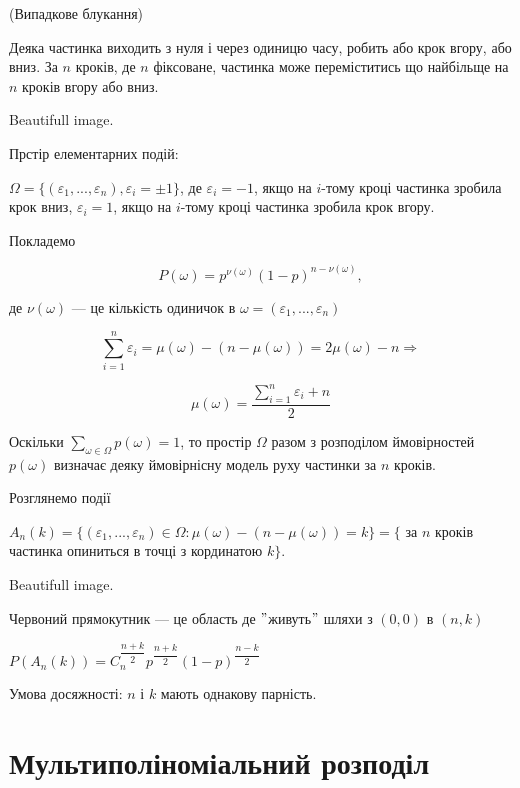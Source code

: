 \begin{example}(Випадкове блукання)

    Деяка частинка виходить з нуля і через одиницю часу, робить або крок вгору,
    або вниз. За $n$ кроків, де $n$ фіксоване, частинка може переміститись що
    найбільще на $n$ кроків вгору або вниз.
\end{example}

\begin{center}
    Beautifull image.
\end{center}

Прстір елементарних подій:

$\Omega = \{(\varepsilon_1, ..., \varepsilon_n), \varepsilon_i = \pm 1\}$, де
$\varepsilon_i = -1$, якщо на $i$-тому кроці частинка зробила крок вниз,
$\varepsilon_i = 1$, якщо на $i$-тому кроці частинка зробила крок вгору.

Покладемо

$$P(\omega) = p^{\nu(\omega)} (1-p)^{n - \nu(\omega)},$$

де $\nu(\omega)$ --- це кількість одиничок в $\omega = (\varepsilon_1, ..., \varepsilon_n)$

$$\sum\limits_{i=1}^n \varepsilon_i = \mu(\omega) - (n - \mu(\omega)) = 2\mu(\omega) - n \Rightarrow$$

$$\mu(\omega) = \dfrac{\sum\limits_{i=1}^n \varepsilon_i + n}{2}$$

Оскільки $\sum\limits_{\omega \in \Omega} p(\omega) = 1$, то простір $\Omega$ разом з
розподілом ймовірностей $p(\omega)$ визначає деяку ймовірнісну модель руху частинки
за $n$ кроків.

Розглянемо події

$A_n(k) = \{(\varepsilon_1, ..., \varepsilon_n) \in \Omega: \mu(\omega) - (n - \mu(\omega)) = k\} = \{$
за $n$ кроків частинка опиниться в точці з кординатою $k\}$.

\begin{center}
    Beautifull image.
\end{center}

Червоний прямокутник --- це область де $"$живуть$"$ шляхи з $(0,0)$ в $(n,k)$

$P(A_n(k)) = C_n^{\dfrac{n+k}{2}} p^{\dfrac{n+k}{2}} (1-p)^{\dfrac{n-k}{2}}$

Умова досяжності: $n$ і $k$ мають однакову парність.

\section{Мультиполіноміальний розподіл}

